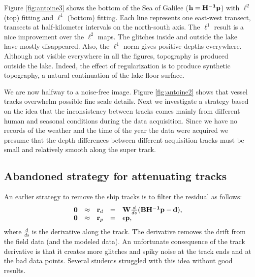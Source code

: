 
\par
Figure \ref{fig:antoine3}
shows the bottom of the Sea of Galilee (${\bf h = {\bf H^{-1}p}}$)
with $\ell^2$ (top) fitting and  $\ell^1$ (bottom) fitting. 
Each line represents one east-west transect,
transects at half-kilometer intervals on the north-south axis.
The $\ell^1$ result is a nice improvement over the $\ell^2$ maps.
The glitches inside and outside the lake have mostly disappeared.
Also, the $\ell^1$ norm gives positive depths everywhere. 
Although not visible everywhere in all the figures,
topography is produced outside the lake.
Indeed, the effect of regularization is to produce synthetic topography,
a natural continuation of the lake floor surface.


\par
We are now halfway to a noise-free image.
Figure \ref{fig:antoine2} shows that
vessel tracks overwhelm possible fine scale details.
Next we investigate a strategy based on the idea that
the inconsistency between tracks comes mainly 
from different human and seasonal conditions during the data acquisition. 
Since we have no records of the weather and the time 
of the year the data were acquired
we presume that the depth differences between different acquisition tracks
must be small and relatively smooth along the super track.


\subsection{Abandoned strategy for attenuating tracks}
An earlier strategy to remove the ship tracks is to filter the
residual as follows:
\begin{equation}
  \begin{array}{lllll}
    \bold 0 &\approx& \bold r_d &=& \bold W \frac{d}{ds}( \bold B \bold {H^{-1}} \bold p - \bold d
    ),\\
    \bold 0 &\approx& \bold r_p &=& \epsilon \bold p,
  \end{array} \label{eq5}
\end{equation}
where $\frac{d}{ds}$ is the derivative along the track. The derivative 
removes the drift from the field data (and the modeled data).
An unfortunate consequence of the track derivative
is that it creates more glitches and spiky noise at the track ends and
at the bad data points.
Several students struggled with this idea without good results.

